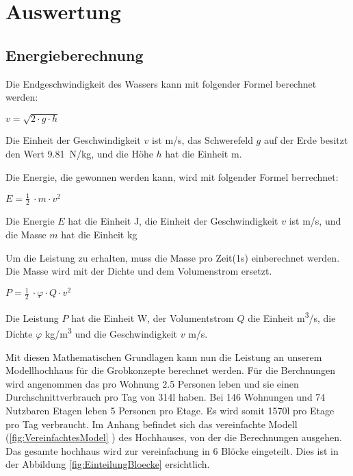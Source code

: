 \section{Auswertung} \label{sec:auswertung}



\subsection{Energieberechnung} \label{subsec:energieberechnung}

Die Endgeschwindigkeit des Wassers kann mit folgender Formel berechnet werden:
\begin{center}
\(v = \sqrt{2 \cdot g \cdot h} \)
\end{center}

Die Einheit der Geschwindigkeit \(v\) ist \si{m/s}, das Schwerefeld \(g\) auf der Erde besitzt den Wert 9.81~\si{N/kg}, und die Höhe \(h\) hat die Einheit \si{m}.

\bigskip

Die Energie, die gewonnen werden kann, wird mit folgender Formel berrechnet:

\begin{center}
\(E =\frac 12\ \cdot m \cdot v^2\)
\end{center}

Die Energie \(E\) hat die Einheit \si{J}, die Einheit der Geschwindigkeit \(v\) ist \si{m/s}, und die Masse \(m\) hat die Einheit \si{kg}

\bigskip

Um die Leistung zu erhalten, muss die Masse pro Zeit(1s) einberechnet werden. Die Masse wird mit der Dichte und dem Volumenstrom ersetzt.

\begin{center}
\(P =\frac 12\ \cdot \varphi \cdot Q \cdot v^2\)
\end{center}

Die Leistung \(P\) hat die Einheit \si{W}, der Volumentstrom \(Q\) die Einheit \si{m^3/s}, die Dichte \(\varphi\) \si{kg/m^3} und die Geschwindigkeit \(v\) \si{m/s}.

\newpage

Mit diesen Mathematischen Grundlagen kann nun die Leistung an unserem Modellhochhaus für die Grobkonzepte berechnet werden. Für die Berchnungen wird angenommen das pro Wohnung 2.5 Personen leben und sie einen Durchschnittverbrauch pro Tag von 314\si{l} haben. Bei 146 Wohnungen und 74 Nutzbaren Etagen leben 5 Personen pro Etage. Es wird somit 1570\si{l} pro Etage pro Tag verbraucht. Im Anhang befindet sich das vereinfachte Modell (\ref{fig:VereinfachtesModel} ) des Hochhauses, von der die Berechnungen ausgehen. Das gesamte hochhaus wird zur vereinfachung in 6 Blöcke eingeteilt. Dies ist in der Abbildung \ref{fig:EinteilungBloecke}  ersichtlich.

